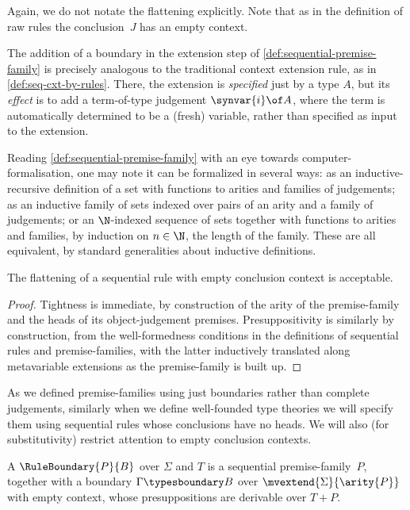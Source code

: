 \noindent%
Again, we do not notate the flattening explicitly.
%
Note that as in the definition of raw rules the conclusion~$J$ has an empty context.

The addition of a boundary in the extension step of  \cref{def:sequential-premise-family} is precisely analogous to the traditional context extension rule, as in \cref{def:seq-cxt-by-rules}.
%
There, the extension is \emph{specified} just by a type $A$, but its \emph{effect} is to add a term-of-type judgement $\synvar{i} \of A$,
%
where the term is automatically determined to be a (fresh) variable, rather than specified as input to the extension.

Reading \cref{def:sequential-premise-family} with an eye towards computer-formalisation, one may note it can be formalized in several ways: as an inductive-recursive definition of a set with functions to arities and families of judgements; as an inductive family of sets indexed over pairs of an arity and a family of judgements; or an $\N$-indexed sequence of sets together with functions to arities and families, by induction on $n \in \N$, the length of the family.
%
These are all equivalent, by standard generalities about inductive definitions.

\begin{proposition}
  The flattening of a sequential rule with empty conclusion context is acceptable.
\end{proposition}

\begin{proof}
  Tightness is immediate, by construction of the arity of the premise-family and the heads of its object-judgement premises.
  Presuppositivity is similarly by construction, from the well-formedness conditions in the definitions of sequential rules and premise-families, with the latter inductively translated along metavariable extensions as the premise-family is built up.
\end{proof}

As we defined premise-families using just boundaries rather than complete judgements, similarly when we define well-founded type theories we will specify them using sequential rules whose conclusions have no heads.
%
We will also (for substitutivity) restrict attention to empty conclusion contexts.

\begin{definition}
  \label{def:rule-boundary}%
  A  $\RuleBoundary{P}{B}$ over $\Sigma$ and $T$ is a sequential premise-family~$P$, together with a boundary $\Gamma \typesboundary B$ over $\mvextend{\Sigma}{\arity{P}}$ with empty context, whose presuppositions are derivable over $T + P$.
\end{definition}

